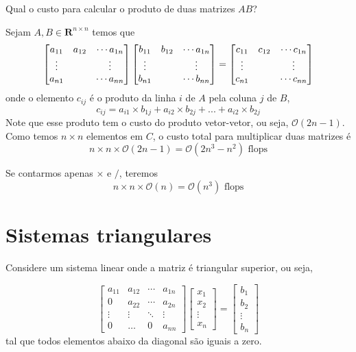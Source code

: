 \begin{ex}
Qual o custo para calcular o produto de duas matrizes  $A B$?
\end{ex}
\begin{sol}
Sejam $A, B \in \mathbf{R}^{n\times n}$ temos que 
\begin{equation}
  \begin{bmatrix} a_{11}&a_{12}&\cdots a_{1n} \\ \vdots&&\vdots \\ a_{n1}&&\cdots a_{nn} \end{bmatrix}
  \begin{bmatrix} b_{11}&b_{12}&\cdots a_{1n} \\ \vdots&&\vdots \\ b_{n1}&&\cdots b_{nn} \end{bmatrix} 
 =\begin{bmatrix} c_{11}&c_{12}&\cdots c_{1n} \\ \vdots&&\vdots \\ c_{n1}&&\cdots c_{nn} \end{bmatrix} 
\end{equation}
onde o elemento $c_{ij}$ é o produto da linha $i$ de $A$ pela coluna $j$ de $B$,
\begin{equation}
  c_{ij}=  a_{i1}\times b_{1j} + a_{i2}\times b_{2j} +...+a_{i2}\times b_{2j}
\end{equation}
Note que esse produto tem o custo do produto vetor-vetor, ou seja, $\mathcal{O}(2n-1)$. Como temos $n\times n$ elementos em $C$, o custo total para multiplicar duas matrizes é
\begin{equation}
  n\times n \times \mathcal{O}(2n-1)=\mathcal{O}(2n^3-n^2) \text{~flops}
\end{equation}

Se contarmos apenas $\times$ e $/$, teremos
\begin{equation}
  n\times n \times \mathcal{O}(n)  = \mathcal{O}(n^3) \text{~flops}
\end{equation}
\end{sol}





\section{Sistemas triangulares}
Considere um sistema linear onde a matriz é triangular superior, ou seja, 

$$\begin{bmatrix}
a_{11} & a_{12} & \cdots & a_{1n}\\
0      & a_{22} & \cdots & a_{2n}\\
\vdots & \vdots & \ddots & \vdots\\
0      & \dots  & 0     & a_{nn}
\end{bmatrix}
\begin{bmatrix}
x_{1} \\
x_{2} \\
\vdots \\
x_{n}
\end{bmatrix} 
 =\begin{bmatrix}
b_{1} \\
b_{2} \\
\vdots \\
b_{n}
\end{bmatrix}
$$
tal que todos elementos abaixo da diagonal são iguais a zero.


